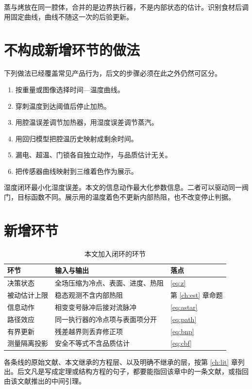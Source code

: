 蒸与烤放在同一腔体，合并的是边界执行器，不是内部状态的估计。识别食材后调用固定曲线，曲线不随这一次的后验更新。

\section{不构成新增环节的做法}

下列做法已经覆盖常见产品行为，后文的步骤必须在此之外仍然可区分。

\begin{enumerate}
\item 按重量或图像选择时间—温度曲线。
\item 穿刺温度到达阈值后停止加热。
\item 用腔温误差调节加热器，用湿度误差调节蒸汽。
\item 用回归模型把腔温历史映射成剩余时间。
\item 漏电、超温、门锁各自独立动作，与品质估计无关。
\item 把传感器曲线映射到三维着色作为展示。
\end{enumerate}

湿度闭环最小化湿度误差。本文的信息动作最大化参数信息。二者可以驱动同一阀门，目标函数不同。展示用的温度着色不更新内部热阻，也不改变停止判据。

\section{新增环节}

\begin{table}[H]
\centering
\caption{本文加入闭环的环节}
\begin{tabularx}{\textwidth}{lXX}
\toprule
环节 & 输入与输出 & 落点 \\
\midrule
决策状态 & 全场压缩为冷点、表面、进度、热阻 & \eqref{eq:z} \\
被动估计上限 & 稳态观测不含内部热阻 & 第 \ref{ch:est} 章命题 \\
信息动作 & 相变变号脉冲后接对流脉冲 & \eqref{eq:astar} \\
路径效应 & 同一执行器的冷点项与表面项分开 & \eqref{eq:path} \\
有界更新 & 残差越界则丢弃修正项 & \eqref{eq:bnp} \\
测量隔离投影 & 安全不等式不含品质估计 & \eqref{eq:cbf} \\
\bottomrule
\end{tabularx}
\end{table}

各条线的原始文献、本文继承的方程层、以及明确不继承的层，按第 \ref{ch:lit} 章列出。后文凡是写成定理或结构方程的句子，都要能指回该章中的一条文献，或指回由该文献推出的中间引理。
